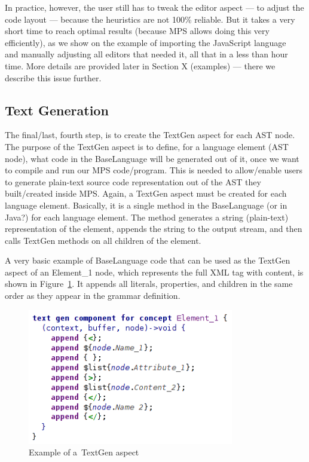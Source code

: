 \documentclass[10pt]{sigplanconf}
\newcommand{\mpsconcept}[1]{\textcolor{mpsconceptcolor}{#1}}
\begin{document}
In practice, however, the user still has to tweak the editor aspect --- to adjust the code layout --- because the heuristics are not 100\% reliable.
But it takes a very short time to reach optimal results (because MPS allows doing this very efficiently), as we show on the example of importing the JavaScript language~\cite{ref:javascript} and manually adjusting all editors that needed it, all that in a less than hour time.
More details are provided later in Section X (examples) --- there we describe this issue further.

\subsection{Text Generation}

The final/last, fourth step, is to create the TextGen aspect for each AST node.
The purpose of the TextGen aspect is to define, for a language element (AST node), what code in the BaseLanguage will be generated out of it, once we want to compile and run our MPS code/program.
This is needed to allow/enable users to generate plain-text source code representation out of the AST they built/created inside MPS.
Again, a TextGen aspect must be created for each language element.
Basically, it is a single method in the BaseLanguage (or in Java?) for each language element.
The method generates a string (plain-text) representation of the element, appends the string to the output stream, and then calls TextGen methods on all children of the element.

A very basic example of BaseLanguage code that can be used as the TextGen aspect of an \mpsconcept{Element{\_}1} node, which represents the full XML tag with content, is shown in Figure~\ref{fig:textgen_example}.
It appends all literals, properties, and children in the same order as they appear in the grammar definition.

\begin{figure}[ht]
	\centering
	\includegraphics[width=90mm]{./images/textgen_example.png}
	\caption{Example of a~TextGen aspect}
	\label{fig:textgen_example}
\end{figure}
\end{document}
